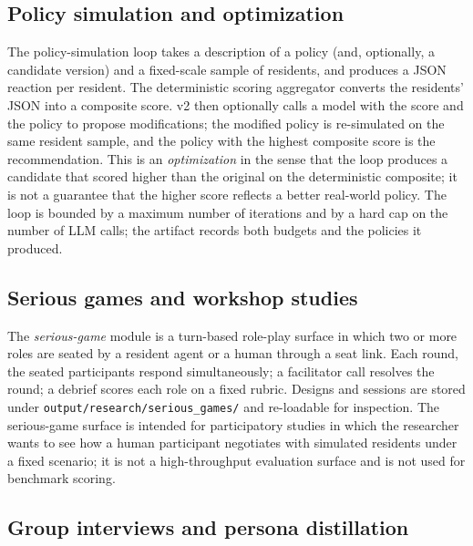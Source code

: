 \subsection{Policy simulation and optimization}

The policy-simulation loop \citep{gaworldpolicy} takes a description of a
policy (and, optionally, a candidate version) and a fixed-scale sample of
residents, and produces a JSON reaction per resident.  The deterministic
scoring aggregator converts the residents' JSON into a composite score.
v2 then optionally calls a model with the score and the policy to propose
modifications; the modified policy is re-simulated on the same resident
sample, and the policy with the highest composite score is the
recommendation.  This is an \emph{optimization} in the sense that the loop
produces a candidate that scored higher than the original on the
deterministic composite; it is not a guarantee that the higher score
reflects a better real-world policy.  The loop is bounded by a maximum
number of iterations and by a hard cap on the number of LLM calls; the
artifact records both budgets and the policies it produced.

\subsection{Serious games and workshop studies}

The \emph{serious-game} module \citep{gaworldseriousgame} is a turn-based
role-play surface in which two or more roles are seated by a resident
agent or a human through a seat link.  Each round, the seated participants
respond simultaneously; a facilitator call resolves the round; a debrief
scores each role on a fixed rubric.  Designs and sessions are stored under
\texttt{output/research/serious\_games/} and re-loadable for inspection.
The serious-game surface is intended for participatory studies in which
the researcher wants to see how a human participant negotiates with
simulated residents under a fixed scenario; it is not a high-throughput
evaluation surface and is not used for benchmark scoring.

\subsection{Group interviews and persona distillation}

